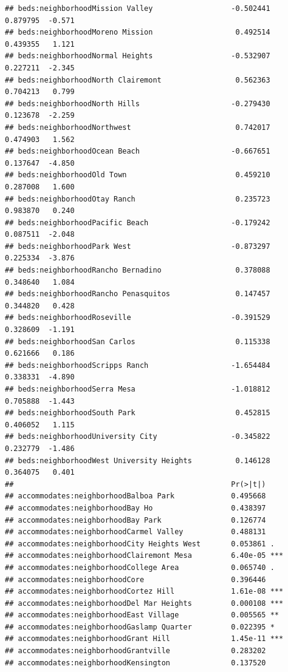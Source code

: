 \documentclass[
]{book}
\begin{document}
\begin{verbatim}
## beds:neighborhoodMission Valley                  -0.502441   0.879795  -0.571
## beds:neighborhoodMoreno Mission                   0.492514   0.439355   1.121
## beds:neighborhoodNormal Heights                  -0.532907   0.227211  -2.345
## beds:neighborhoodNorth Clairemont                 0.562363   0.704213   0.799
## beds:neighborhoodNorth Hills                     -0.279430   0.123678  -2.259
## beds:neighborhoodNorthwest                        0.742017   0.474903   1.562
## beds:neighborhoodOcean Beach                     -0.667651   0.137647  -4.850
## beds:neighborhoodOld Town                         0.459210   0.287008   1.600
## beds:neighborhoodOtay Ranch                       0.235723   0.983870   0.240
## beds:neighborhoodPacific Beach                   -0.179242   0.087511  -2.048
## beds:neighborhoodPark West                       -0.873297   0.225334  -3.876
## beds:neighborhoodRancho Bernadino                 0.378088   0.348640   1.084
## beds:neighborhoodRancho Penasquitos               0.147457   0.344820   0.428
## beds:neighborhoodRoseville                       -0.391529   0.328609  -1.191
## beds:neighborhoodSan Carlos                       0.115338   0.621666   0.186
## beds:neighborhoodScripps Ranch                   -1.654484   0.338331  -4.890
## beds:neighborhoodSerra Mesa                      -1.018812   0.705888  -1.443
## beds:neighborhoodSouth Park                       0.452815   0.406052   1.115
## beds:neighborhoodUniversity City                 -0.345822   0.232779  -1.486
## beds:neighborhoodWest University Heights          0.146128   0.364075   0.401
##                                                  Pr(>|t|)    
## accommodates:neighborhoodBalboa Park             0.495668    
## accommodates:neighborhoodBay Ho                  0.438397    
## accommodates:neighborhoodBay Park                0.126774    
## accommodates:neighborhoodCarmel Valley           0.488131    
## accommodates:neighborhoodCity Heights West       0.053861 .  
## accommodates:neighborhoodClairemont Mesa         6.40e-05 ***
## accommodates:neighborhoodCollege Area            0.065740 .  
## accommodates:neighborhoodCore                    0.396446    
## accommodates:neighborhoodCortez Hill             1.61e-08 ***
## accommodates:neighborhoodDel Mar Heights         0.000108 ***
## accommodates:neighborhoodEast Village            0.005565 ** 
## accommodates:neighborhoodGaslamp Quarter         0.022395 *  
## accommodates:neighborhoodGrant Hill              1.45e-11 ***
## accommodates:neighborhoodGrantville              0.283202    
## accommodates:neighborhoodKensington              0.137520    

\end{verbatim}
\end{document}
